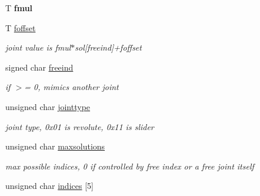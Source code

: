\begin{DoxyCompactItemize}
\item 
\hypertarget{classikfast_1_1IkSingleDOFSolutionBase_adb64a33a2ce7357684c9c89d75cacd0c}{T {\bfseries fmul}}\label{classikfast_1_1IkSingleDOFSolutionBase_adb64a33a2ce7357684c9c89d75cacd0c}

\item 
\hypertarget{classikfast_1_1IkSingleDOFSolutionBase_a1d5900ae9cb2d55c396b995b976fdcef}{T \hyperlink{classikfast_1_1IkSingleDOFSolutionBase_a1d5900ae9cb2d55c396b995b976fdcef}{foffset}}\label{classikfast_1_1IkSingleDOFSolutionBase_a1d5900ae9cb2d55c396b995b976fdcef}

\begin{DoxyCompactList}\small\item\em joint value is fmul$\ast$sol\mbox{[}freeind\mbox{]}+foffset \end{DoxyCompactList}\item 
\hypertarget{classikfast_1_1IkSingleDOFSolutionBase_adca245b0afa4133dddbd10803053bc2a}{signed char \hyperlink{classikfast_1_1IkSingleDOFSolutionBase_adca245b0afa4133dddbd10803053bc2a}{freeind}}\label{classikfast_1_1IkSingleDOFSolutionBase_adca245b0afa4133dddbd10803053bc2a}

\begin{DoxyCompactList}\small\item\em if $>$= 0, mimics another joint \end{DoxyCompactList}\item 
\hypertarget{classikfast_1_1IkSingleDOFSolutionBase_a3c458c4a2b06b4a2ccffc265cf34c6fe}{unsigned char \hyperlink{classikfast_1_1IkSingleDOFSolutionBase_a3c458c4a2b06b4a2ccffc265cf34c6fe}{jointtype}}\label{classikfast_1_1IkSingleDOFSolutionBase_a3c458c4a2b06b4a2ccffc265cf34c6fe}

\begin{DoxyCompactList}\small\item\em joint type, 0x01 is revolute, 0x11 is slider \end{DoxyCompactList}\item 
\hypertarget{classikfast_1_1IkSingleDOFSolutionBase_a45404bf30c7b90131b7ce2b8045c6f6a}{unsigned char \hyperlink{classikfast_1_1IkSingleDOFSolutionBase_a45404bf30c7b90131b7ce2b8045c6f6a}{maxsolutions}}\label{classikfast_1_1IkSingleDOFSolutionBase_a45404bf30c7b90131b7ce2b8045c6f6a}

\begin{DoxyCompactList}\small\item\em max possible indices, 0 if controlled by free index or a free joint itself \end{DoxyCompactList}\item 
\hypertarget{classikfast_1_1IkSingleDOFSolutionBase_a50d8439b7f735a474f6dfe42e91de455}{unsigned char \hyperlink{classikfast_1_1IkSingleDOFSolutionBase_a50d8439b7f735a474f6dfe42e91de455}{indices} \mbox{[}5\mbox{]}}\label{classikfast_1_1IkSingleDOFSolutionBase_a50d8439b7f735a474f6dfe42e91de455}


\end{DoxyCompactItemize}
